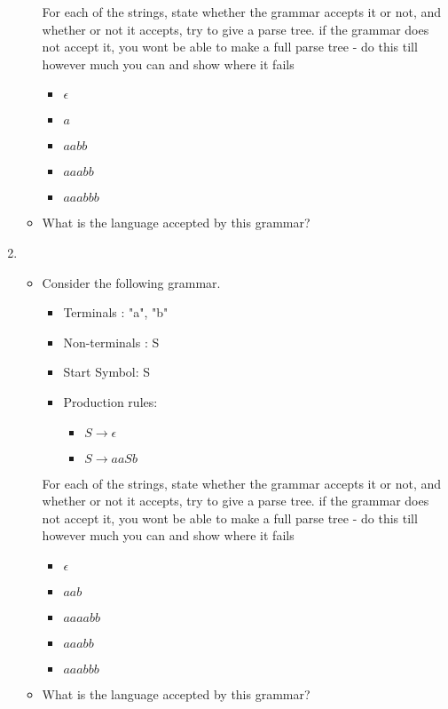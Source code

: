 \documentclass[10pt]{article}
\begin{document}
\begin{enumerate}
\begin{itemize}
    For each of the strings, state whether the grammar accepts it or not, and whether or not it accepts, try to give a parse tree. if the grammar does not accept it, you wont be able to make a full parse tree - do this till however much you can and show where it fails
    \begin{itemize}
        \item $\epsilon$
        \item $a$
        \item $aabb$
        \item $aaabb$
        \item $aaabbb$
    \end{itemize}
        \item What is the language accepted by this grammar?

\end{itemize}

\item
\begin{itemize}
    \item Consider the following grammar. \\
    \begin{itemize}
        \item Terminals : "a", "b"
        \item Non-terminals : S
        \item Start Symbol: S
        \item Production rules:
        \begin{itemize}
            \item $S \rightarrow \epsilon$
            \item $S \rightarrow aaSb$
        \end{itemize}
    \end{itemize}

    For each of the strings, state whether the grammar accepts it or not, and whether or not it accepts, try to give a parse tree. if the grammar does not accept it, you wont be able to make a full parse tree - do this till however much you can and show where it fails
    \begin{itemize}
        \item $\epsilon$
        \item $aab$
        \item $aaaabb$
        \item $aaabb$
        \item $aaabbb$
    \end{itemize}
    \item What is the language accepted by this grammar?
\end{itemize}


\end{enumerate}
\end{document}
